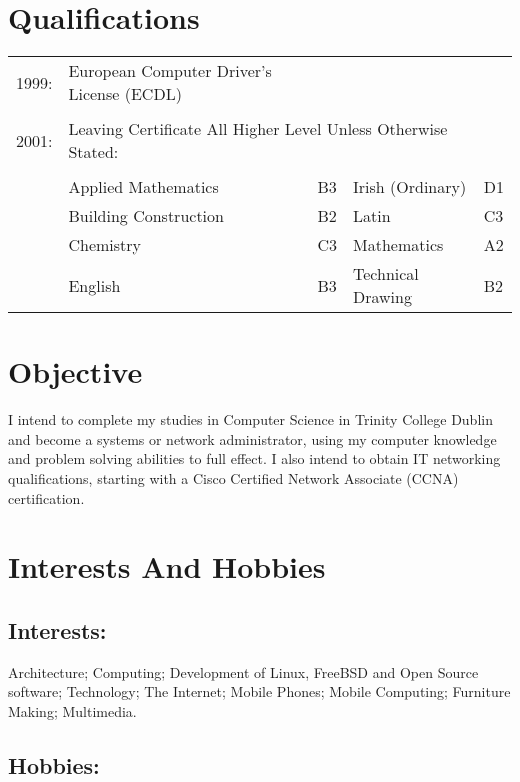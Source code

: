 \documentclass[a4paper, 11pt] {article}
\begin{document}
\section*{Qualifications}

\begin{tabular}{l l l l l}
1999: 	& European Computer Driver's License (ECDL) 	&		&	&	\\
			&                         							&		&	&	\\
2001:		& \multicolumn{3}{l}{Leaving Certificate	All Higher Level Unless Otherwise Stated:} 	\\
			&											  			   &		&	&	\\
			& Applied Mathematics								& B3 	&	Irish (Ordinary) 		& D1	\\
			& Building Construction								& B2 	&	Latin 					& C3	\\
			& Chemistry 	   									& C3	&	Mathematics 	   	& A2	\\	
			& English 												& B3 	&	Technical Drawing 	& B2	\\
\end{tabular}

\section*{Objective}

I intend to complete my studies in Computer Science in Trinity College 
Dublin and become a systems or network administrator, using my computer
knowledge and problem solving abilities to full effect. I also intend to
obtain IT networking qualifications, starting with a Cisco Certified
Network Associate (CCNA) certification.

\section*{Interests And Hobbies}

\subsection*{Interests:}

Architecture; Computing; Development of Linux, FreeBSD and Open Source
software; Technology; The Internet; Mobile Phones; Mobile Computing; 
Furniture Making; Multimedia.

\subsection*{Hobbies:}
\end{document}
